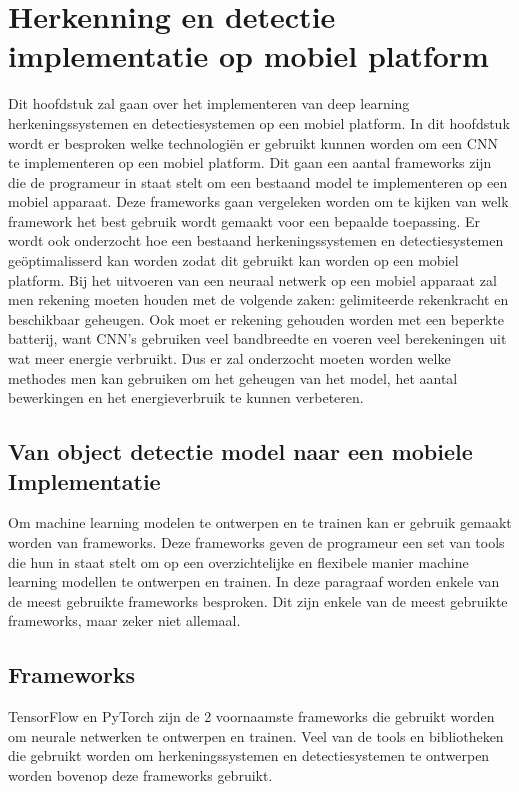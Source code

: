  
\chapter{Herkenning en detectie implementatie op mobiel platform}
Dit hoofdstuk zal gaan over het implementeren van deep learning herkeningssystemen en detectiesystemen op een mobiel platform.
In dit hoofdstuk wordt er besproken welke technologi\"en er gebruikt kunnen worden om een CNN te implementeren op een mobiel platform.
Dit gaan een aantal frameworks zijn die de programeur in staat stelt om een bestaand model te implementeren op een mobiel apparaat.
Deze frameworks gaan vergeleken worden om te kijken van welk framework het best gebruik wordt gemaakt voor een bepaalde toepassing.
Er wordt ook onderzocht hoe een bestaand herkeningssystemen en detectiesystemen ge\"optimalisserd kan worden zodat dit gebruikt kan worden op een mobiel platform.
Bij het uitvoeren van een neuraal netwerk op een mobiel apparaat zal men rekening moeten houden met de volgende zaken: 
gelimiteerde rekenkracht en beschikbaar geheugen.
Ook moet er rekening gehouden worden met een beperkte batterij, want CNN's gebruiken veel bandbreedte en voeren veel berekeningen uit wat meer energie verbruikt.
Dus er zal onderzocht moeten worden welke methodes men kan gebruiken om het geheugen van het model, het aantal bewerkingen en het energieverbruik te kunnen verbeteren.

\section{Van object detectie model naar een mobiele Implementatie}
Om machine learning modelen te ontwerpen en te trainen kan er gebruik gemaakt worden van frameworks.
Deze frameworks geven de programeur een set van tools die hun in staat stelt om op een overzichtelijke en flexibele manier machine learning modellen te ontwerpen en trainen.
In deze paragraaf worden enkele van de meest gebruikte frameworks besproken.
Dit zijn enkele van de meest gebruikte frameworks, maar zeker niet allemaal.

\section{Frameworks}
TensorFlow en PyTorch zijn de 2 voornaamste frameworks die gebruikt worden om neurale netwerken te ontwerpen en trainen.
Veel van de tools en bibliotheken die gebruikt worden om herkeningssystemen en detectiesystemen te ontwerpen worden bovenop deze frameworks gebruikt.

